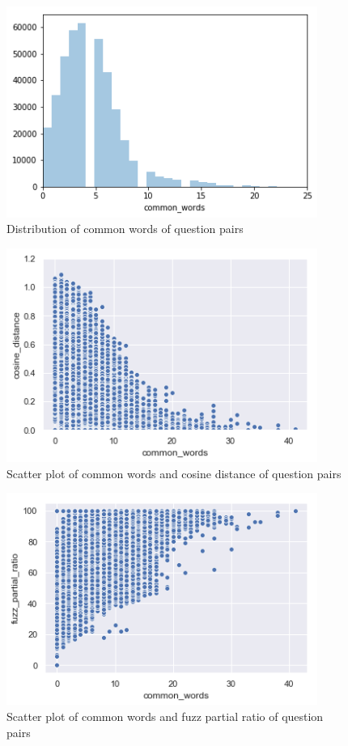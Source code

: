 \begin{figure}[tbh]
\begin{center}
	\includegraphics[width=4in]{images/common.png}
	\caption{Distribution of common words of question pairs}
	\label{common}
\end{center}
\end{figure}

\newpage
\begin{figure}[tbh]
\begin{center}
	\includegraphics[width=4in]{images/scatter1.png}
	\caption{Scatter plot of common words and cosine distance of question pairs}
	\label{scatter1}
\end{center}
\end{figure}

\begin{figure}[tbh]
\begin{center}
	\includegraphics[width=4in]{images/scatter2.png}
	\caption{Scatter plot of common words and fuzz partial ratio of question pairs}
	\label{scatter2}
\end{center}
\end{figure}

